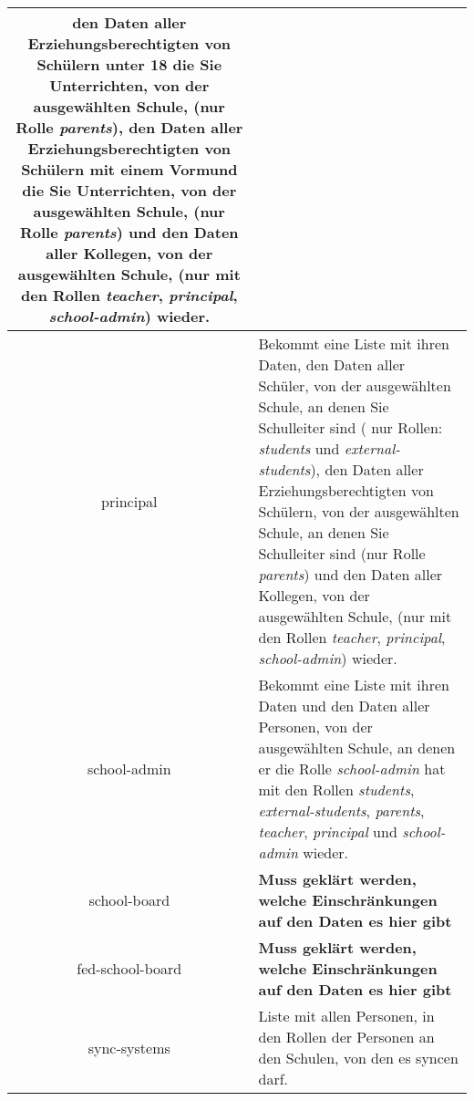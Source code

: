 \begin{longtable}{|c|p{}|}
					den Daten aller Erziehungsberechtigten von Schülern unter 18 die Sie Unterrichten, von der ausgewählten Schule, (nur Rolle \textit{parents}),
					den Daten aller Erziehungsberechtigten von Schülern mit einem Vormund die Sie Unterrichten, von der ausgewählten Schule, (nur Rolle \textit{parents}) und
					den Daten aller Kollegen, von der ausgewählten Schule, (nur mit den Rollen \textit{teacher}, \textit{principal}, \textit{school-admin}) 
					wieder.\\ \hline
principal & Bekommt eine Liste mit ihren Daten,
            den Daten aller Schüler, von der ausgewählten Schule, an denen Sie Schulleiter sind ( nur Rollen: \textit{students} und \textit{external-students}),
						den Daten aller Erziehungsberechtigten von Schülern, von der ausgewählten Schule, an denen Sie Schulleiter sind (nur Rolle \textit{parents}) und
					  den Daten aller Kollegen, von der ausgewählten Schule, (nur mit den Rollen \textit{teacher}, \textit{principal}, \textit{school-admin})
						wieder.\\ \hline
school-admin & Bekommt eine Liste mit ihren Daten und
               den Daten aller Personen, von der ausgewählten Schule, an denen er die Rolle \textit{school-admin} hat mit den Rollen \textit{students}, \textit{external-students}, \textit{parents}, \textit{teacher}, \textit{principal} und \textit{school-admin} wieder.  \\ \hline
school-board & \textcolor[rgb]{1,0.41,0.13}{\textbf{Muss geklärt werden, welche Einschränkungen auf den Daten es hier gibt}} \\ \hline
fed-school-board & \textcolor[rgb]{1,0.41,0.13}{\textbf{Muss geklärt werden, welche Einschränkungen auf den Daten es hier gibt}} \\ \hline
sync-systems & Liste mit allen Personen, in den Rollen der Personen an den Schulen, von den es syncen darf. \\ \hline
	\end{longtable}